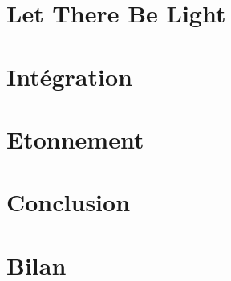 \section{Let There Be Light}
\par
\section{Intégration}
\par
\section{Etonnement}
\par
\section{Conclusion}
\par
\section{Bilan}
\par